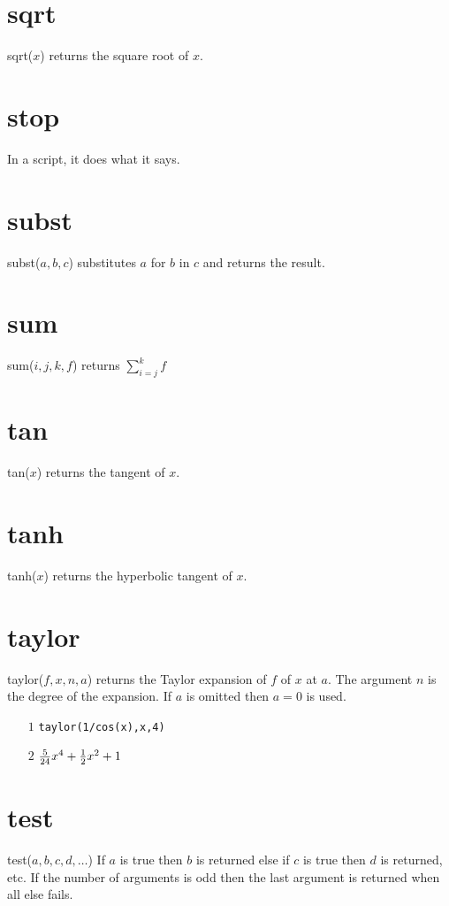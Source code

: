 \documentclass[12pt,openany]{report}
\begin{document}
\section*{sqrt}
sqrt($x$) returns the square root of $x$.

\section*{stop}
In a script, it does what it says.

\section*{subst}
subst($a,b,c$) substitutes $a$ for $b$ in $c$ and returns the result.

\section*{sum}
sum($i,j,k,f$) returns $\displaystyle\sum_{i=j}^k f$

\section*{tan}
tan($x$) returns the tangent of $x$.

\section*{tanh}
tanh($x$) returns the hyperbolic tangent of $x$.

\section*{taylor}
taylor($f,x,n,a$) returns the Taylor expansion of $f$ of $x$ at $a$.
The argument $n$ is the degree of the expansion.
If $a$ is omitted then $a=0$ is used.
\begin{itemize}
\item[$\scriptstyle1$]{\tt taylor(1/cos(x),x,4)}
\item[$\scriptstyle2$]\hspace{50pt} ${5\over24}x^4+{1\over2}x^2+1$
\end{itemize}

\section*{test}
test($a,b,c,d,\ldots$)
If $a$ is true then $b$ is returned else if $c$ is true then $d$ is returned, etc.
If the number of arguments is odd then the last argument is returned when all else fails.
\end{document}

